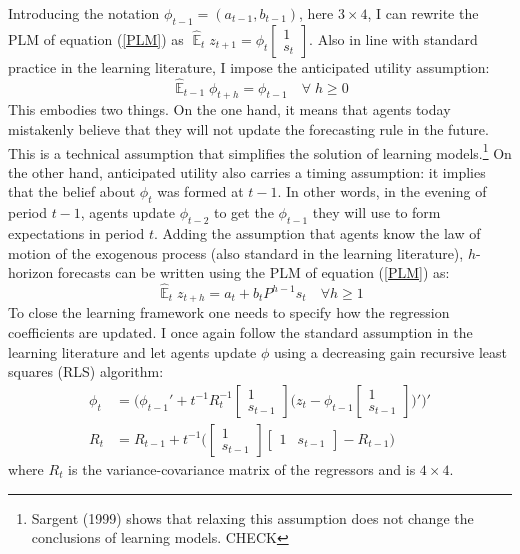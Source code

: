 \documentclass[11pt]{article}
\renewcommand{\[}{\begin{equation}}
\renewcommand{\]}{\end{equation}}
\DeclareMathOperator{\E}{\mathbb{E}}
\begin{document}
Introducing the notation $\phi_{t-1} = (a_{t-1}, b_{t-1})$, here $3\times 4$, I can rewrite the PLM of equation (\ref{PLM}) as $\hat{\E}_t z_{t+1} = \phi_{t}\begin{bmatrix} 1 \\ s_{t} \end{bmatrix} $. Also in line with standard practice in the learning literature, I impose the anticipated utility assumption:
\begin{equation}
\hat{\E}_{t-1}{\phi_{t+h}} = \phi_{t-1} \quad \forall \; h\geq0 
\end{equation}
This embodies two things. On the one hand, it means that agents today mistakenly believe that they will not update the forecasting rule in the future. This is a technical assumption that simplifies the solution of learning models.\footnote{Sargent (1999) shows that relaxing this assumption does not change the conclusions of learning models. CHECK} On the other hand, anticipated utility also carries a timing assumption: it implies that the belief about $\phi_t$ was formed at $t-1$. In other words, in the evening of period $t-1$, agents update $\phi_{t-2}$ to get the $\phi_{t-1}$ they will use to form expectations in period $t$.
Adding the assumption that agents know the law of motion of the exogenous process (also standard in the learning literature), $h$-horizon forecasts can be written using the PLM of equation (\ref{PLM}) as:
\begin{equation}
\hat{\E}_t z_{t+h} = a_{t} + b_{t}P^{h-1}s_t  \quad \forall h\geq 1 \label{PLM_fcst_general}
\end{equation}
To close the learning framework one needs to specify how the regression coefficients are updated. I once again follow the standard assumption in the learning literature and let agents update $\phi$ using a decreasing gain recursive least squares (RLS) algorithm:
\begin{align}
\phi_t  & = \bigg( \phi_{t-1}' + t^{-1} R_t^{-1}\begin{bmatrix} 1 \\ s_{t-1} \end{bmatrix}\bigg(z_{t} - \phi_{t-1} \begin{bmatrix} 1 \\ s_{t-1} \end{bmatrix} \bigg)' \bigg)' \\
R_t &= R_{t-1} +  t^{-1} \bigg( \begin{bmatrix} 1 \\ s_{t-1} \end{bmatrix} \begin{bmatrix} 1 & s_{t-1} \end{bmatrix}  - R_{t-1} \bigg)
\end{align}
where $R_t$ is the variance-covariance matrix of the regressors and is $4\times 4$.
\end{document}
